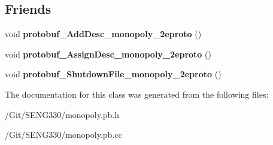 \subsection*{Friends}
\begin{DoxyCompactItemize}
\item 
\hypertarget{classmonopoly_1_1_buyable_grid_a946ee1d082b81a7d0361879406b700b7}{}void {\bfseries protobuf\+\_\+\+Add\+Desc\+\_\+monopoly\+\_\+2eproto} ()\label{classmonopoly_1_1_buyable_grid_a946ee1d082b81a7d0361879406b700b7}

\item 
\hypertarget{classmonopoly_1_1_buyable_grid_afdd09e65c445afc8bffa7a2679963dfb}{}void {\bfseries protobuf\+\_\+\+Assign\+Desc\+\_\+monopoly\+\_\+2eproto} ()\label{classmonopoly_1_1_buyable_grid_afdd09e65c445afc8bffa7a2679963dfb}

\item 
\hypertarget{classmonopoly_1_1_buyable_grid_a5eef3ccc53de8b4f594086f8d47b2ee8}{}void {\bfseries protobuf\+\_\+\+Shutdown\+File\+\_\+monopoly\+\_\+2eproto} ()\label{classmonopoly_1_1_buyable_grid_a5eef3ccc53de8b4f594086f8d47b2ee8}

\end{DoxyCompactItemize}


The documentation for this class was generated from the following files\+:\begin{DoxyCompactItemize}
\item 
/\+Git/\+S\+E\+N\+G330/monopoly.\+pb.\+h\item 
/\+Git/\+S\+E\+N\+G330/monopoly.\+pb.\+cc\end{DoxyCompactItemize}
